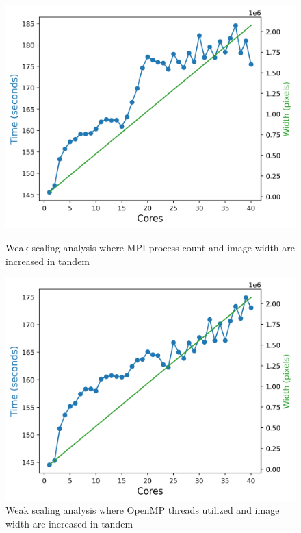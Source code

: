 \begin{figure}[h]
  \centering
 \begin{minipage}{0.45\linewidth}
  \includegraphics[width=\linewidth]{figs/mpi_weak2.out}
 \caption{Weak scaling analysis where MPI process count and image width are increased in tandem  }
    \label{fig:mpi_weak2}
    \end{minipage}
  \hspace{.05\linewidth}
  \begin{minipage}{0.45\linewidth}
      \includegraphics[width=\linewidth]{figs/omp_weak2.out}
      \caption{Weak scaling analysis where OpenMP threads utilized and image width are increased in tandem}

\end{minipage}
\end{figure}
